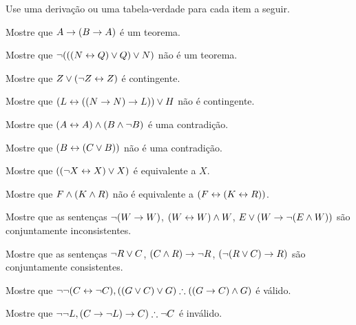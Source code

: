 \noindent\problempart Use uma derivação ou uma tabela-verdade para cada item a seguir.
\begin{compactlist}%
\item Mostre que $A \rightarrow (B \rightarrow A)$ é um teorema.
\item Mostre que $\neg (((N \leftrightarrow Q) \vee Q) \vee N)$ não é um teorema.
\item Mostre que $ Z \vee (\neg Z \leftrightarrow Z) $ é contingente.
\item Mostre que $ (L \leftrightarrow ((N \rightarrow N) \rightarrow L)) \vee H $ não é contingente.
\item Mostre que $ (A \leftrightarrow A) \wedge (B \wedge \neg B)$ é uma contradição.
\item Mostre que $ (B \leftrightarrow (C \vee B)) $ não é uma contradição.
\item Mostre que $ ((\neg X \leftrightarrow X) \vee X) $ é equivalente a $X$.
\item Mostre que $F \wedge (K \wedge R) $ não é equivalente a $ (F \leftrightarrow (K \leftrightarrow R)) $.
\item Mostre que as sentenças $ \neg (W \rightarrow W)$, $(W \leftrightarrow W) \wedge W$, $E \vee (W \rightarrow \neg (E \wedge W))$ são conjuntamente inconsistentes.
\item Mostre que as sentenças $\neg R \vee C $, $(C \wedge R) \rightarrow \neg R$, $(\neg (R \vee C) \rightarrow R) $ são conjuntamente consistentes.
\item Mostre que $\enot \enot (C \eiff \enot C), ((G \eor C) \eor G) \therefore ((G \eif C) \eand G) $ é válido.
\item Mostre que $ \enot \enot L,  (C \eif \enot L) \eif C) \therefore \enot C$ é inválido.
\end{compactlist}
